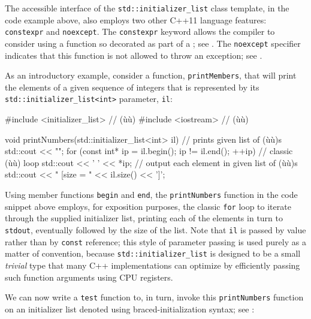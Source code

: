 The accessible interface of the \lstinline!std::initializer_list! class
template, in the code example above, also employs two other C++11
language features: \lstinline!constexpr! and \lstinline!noexcept!. The
\lstinline!constexpr! keyword allows the compiler to consider using a
function so decorated as part of a ; see . The \lstinline!noexcept!
specifier indicates that this function is not allowed to throw an
exception; see .

As an introductory example, consider a function, \lstinline!printMembers!,
that will print the elements of a given sequence of integers that is
represented by its \lstinline!std::initializer_list<int>! parameter,
\lstinline!il!:

\begin{emcppslisting}[emcppsbatch=e2]
#include <initializer_list>  // (ù{}ù)
#include <iostream>          // (ù{}ù)

void printNumbers(std::initializer_list<int> il)  // prints given list of (ù{}ù)s
{
    std::cout << "{";
    for (const int* ip = il.begin(); ip != il.end(); ++ip)  // classic (ù{}ù) loop
    {
        std::cout << ' ' << *ip;  // output each element in given list of (ù{}ù)s
    }
    std::cout << " } [size = " << il.size() << ']';
}
\end{emcppslisting}
    

\noindent Using member functions \lstinline!begin! and \lstinline!end!, the
\lstinline!printNumbers! function in the code snippet above employs, for
exposition purposes, the classic \lstinline!for! loop to iterate through
the supplied initializer list, printing each of the elements in turn to
\lstinline!stdout!, eventually followed by the size of the list. Note that
\lstinline!il! is passed by value rather than by \lstinline!const! reference;
this style of parameter passing is used purely as a matter of
convention, because \lstinline!std::initializer_list! is designed to be a
small \emph{trivial} type that many C++ implementations can optimize by
efficiently passing such function arguments using CPU registers.

We can now write a \lstinline!test! function to, in turn, invoke this
\lstinline!printNumbers! function on an initializer list denoted using
braced-initialization syntax; see : 

